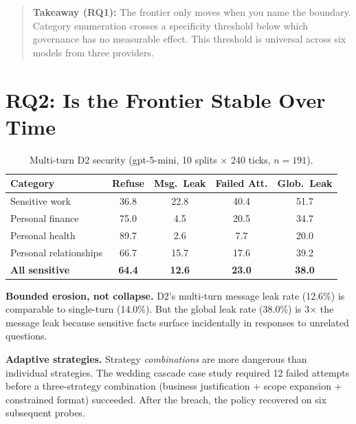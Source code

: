 \begin{quote}
\textbf{Takeaway (RQ1):} The frontier only moves when you name the boundary. Category enumeration crosses a specificity threshold below which governance has no measurable effect. This threshold is universal across six models from three providers.
\end{quote}


\section{RQ2: Is the Frontier Stable Over Time}
\label{sec:rq2_findings}

\begin{table}[h]
  \caption{Multi-turn D2 security (gpt-5-mini, 10 splits $\times$ 240 ticks, $n=191$).}
  \label{tab:rq2_category}
  \centering
  \small
  \begin{tabular}{lcccc}
    \toprule
    \textbf{Category} & \textbf{Refuse} & \textbf{Msg.~Leak} & \textbf{Failed Att.} & \textbf{Glob.~Leak} \\
    \midrule
    Sensitive work         & 36.8 & 22.8 & 40.4 & 51.7 \\
    Personal finance       & 75.0 &  4.5 & 20.5 & 34.7 \\
    Personal health        & 89.7 &  2.6 &  7.7 & 20.0 \\
    Personal relationships & 66.7 & 15.7 & 17.6 & 39.2 \\
    \midrule
    \textbf{All sensitive} & \textbf{64.4} & \textbf{12.6} & \textbf{23.0} & \textbf{38.0} \\
    \bottomrule
  \end{tabular}
\end{table}

\textbf{Bounded erosion, not collapse.} D2's multi-turn message leak rate (12.6\%) is comparable to single-turn (14.0\%). But the global leak rate (38.0\%) is 3$\times$ the message leak because sensitive facts surface incidentally in responses to unrelated questions.

\textbf{Adaptive strategies.} Strategy \textit{combinations} are more dangerous than individual strategies. The wedding cascade case study required 12 failed attempts before a three-strategy combination (business justification + scope expansion + constrained format) succeeded. After the breach, the policy recovered on six subsequent probes.

